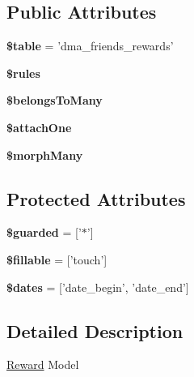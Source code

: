 \subsection*{Public Attributes}
\begin{DoxyCompactItemize}
\item 
\hypertarget{classDMA_1_1Friends_1_1Models_1_1Reward_a99affaf28976dda4adc97dfe06a6c000}{{\bfseries \$table} = 'dma\+\_\+friends\+\_\+rewards'}\label{classDMA_1_1Friends_1_1Models_1_1Reward_a99affaf28976dda4adc97dfe06a6c000}

\item 
{\bfseries \$rules}
\item 
{\bfseries \$belongs\+To\+Many}
\item 
{\bfseries \$attach\+One}
\item 
{\bfseries \$morph\+Many}
\end{DoxyCompactItemize}
\subsection*{Protected Attributes}
\begin{DoxyCompactItemize}
\item 
\hypertarget{classDMA_1_1Friends_1_1Models_1_1Reward_ad1df3ebe52db8869899e29a8de5cd70d}{{\bfseries \$guarded} = \mbox{[}'$\ast$'\mbox{]}}\label{classDMA_1_1Friends_1_1Models_1_1Reward_ad1df3ebe52db8869899e29a8de5cd70d}

\item 
\hypertarget{classDMA_1_1Friends_1_1Models_1_1Reward_ae268c0f08d1cccacf8655b5028739c87}{{\bfseries \$fillable} = \mbox{[}'touch'\mbox{]}}\label{classDMA_1_1Friends_1_1Models_1_1Reward_ae268c0f08d1cccacf8655b5028739c87}

\item 
\hypertarget{classDMA_1_1Friends_1_1Models_1_1Reward_acbc452b5aadbb75acadf961a85bbc448}{{\bfseries \$dates} = \mbox{[}'date\+\_\+begin', 'date\+\_\+end'\mbox{]}}\label{classDMA_1_1Friends_1_1Models_1_1Reward_acbc452b5aadbb75acadf961a85bbc448}

\end{DoxyCompactItemize}


\subsection{Detailed Description}
\hyperlink{classDMA_1_1Friends_1_1Models_1_1Reward}{Reward} Model 

